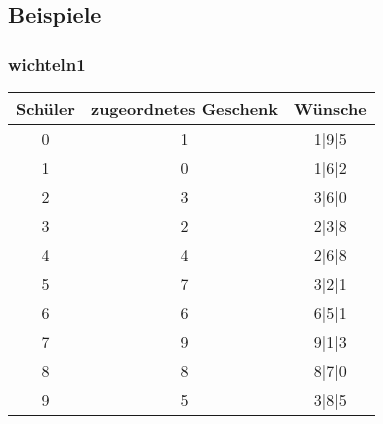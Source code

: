 \documentclass[a4paper, 12pt]{scrartcl}
\begin{document}
\subsection{Beispiele}

\subsubsection{wichteln1}
\begin{table}[H]
    \centering
\begin{tabular}{@{}ccc@{}}
\toprule
Schüler & zugeordnetes Geschenk & Wünsche               \\ \midrule
0        &     1                &  1|9|5    \\
1        &     0                &  1|6|2    \\
2        &     3                &  3|6|0    \\
3        &     2                &  2|3|8    \\
4        &     4                &  2|6|8    \\
5        &     7                &  3|2|1    \\
6        &     6                &  6|5|1    \\
7        &     9                &  9|1|3    \\
8        &     8                &  8|7|0    \\
9        &     5                &  3|8|5    \\
    \bottomrule

\end{tabular}
\end{table}
\end{document}
